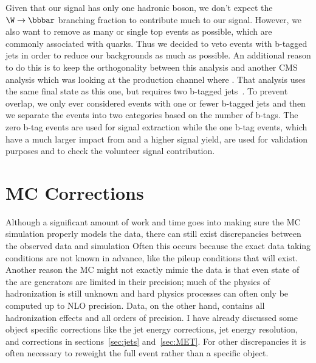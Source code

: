 Given that our signal has only one hadronic \W boson, we don't expect the $\W\rightarrow\bbbar$ branching fraction to contribute much to our signal.
However, we also want to remove as many \ttbar or single top events as possible, which are commonly associated with \cPqb quarks.
Thus we decided to veto events with b-tagged jets in order to reduce our backgrounds as much as possible.
An additional reason to do this is to keep the orthogonality between this analysis and another CMS analysis which was looking at the \VH production channel where \Hbb.
That analysis uses the same final state as this one, but requires two b-tagged jets~\cite{PhysRevD.89.012003}.
To prevent overlap, we only ever considered events with one or fewer b-tagged jets and then we separate the events into two categories based on the number of b-tags.
The zero b-tag events are used for signal extraction while the one b-tag events, which have a much larger impact from \ttbar and a higher \Hbb signal yield, are used for validation purposes and to check the volunteer signal contribution.


\section{MC Corrections}

Although a significant amount of work and time goes into making sure the MC simulation properly models the data, there can still exist discrepancies between the observed data and simulation
Often this occurs because the exact data taking conditions are not known in advance, like the pileup conditions that will exist.
Another reason the MC might not exactly mimic the data is that even state of the are generators are limited in their precision; much of the physics of hadronization is still unknown and hard physics processes can often only be computed up to NLO precision.
Data, on the other hand, contains all hadronization effects and all orders of precision.
I have already discussed some object specific corrections like the jet energy corrections, jet energy resolution, and \VETslash corrections in sections~\ref{sec:jets} and~\ref{sec:MET}.
For other discrepancies it is often necessary to reweight the full event rather than a specific object.

